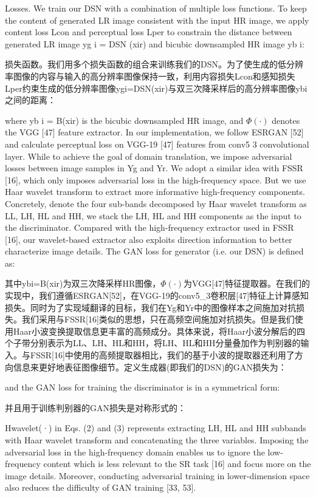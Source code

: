 Losses. We train our DSN with a combination of multiple loss functions. To keep the content of generated LR image consistent with the input HR image, we apply content loss Lcon and perceptual loss Lper to constrain the distance between generated LR image yg i = DSN (xir) and bicubic downsampled HR image yb i:

损失函数。我们用多个损失函数的组合来训练我们的DSN。为了使生成的低分辨率图像的内容与输入的高分辨率图像保持一致，利用内容损失Lcon和感知损失Lper约束生成的低分辨率图像ygi=DSN(xir)与双三次降采样后的高分辨率图像ybi之间的距离：

where yb i = B(xir) is the bicubic downsampled HR image, and $\Phi(\cdot)$ denotes the VGG [47] feature extractor. In our implementation, we follow ESRGAN [52] and calculate perceptual loss on VGG-19 [47] features from conv5 3 convolutional layer. While to achieve the goal of domain translation, we impose adversarial losses between image samples in Yg and Yr. We adopt a similar idea with FSSR [16], which only imposes adversarial loss in the high-frequency space. But we use Haar wavelet transform to extract more informative high-frequency components. Concretely, denote the four sub-bands decomposed by Haar wavelet transform as LL, LH, HL and HH, we stack the LH, HL and HH components as the input to the discriminator. Compared with the high-frequency extractor used in FSSR [16], our wavelet-based extractor also exploits direction information to better characterize image details. The GAN loss for generator (i.e. our DSN) is defined as:

其中ybi=B(xir)为双三次降采样HR图像，$\Phi(\cdot)$为VGG[47]特征提取器。在我们的实现中，我们遵循ESRGAN[52]，在VGG-19的conv5\_3卷积层[47]特征上计算感知损失。同时为了实现域翻译的目标，我们在Yg和Yr中的图像样本之间施加对抗损失。我们采用与FSSR[16]类似的思想，只在高频空间施加对抗损失。但是我们使用Haar小波变换提取信息更丰富的高频成分。具体来说，将Haar小波分解后的四个子带分别表示为LL、LH、HL和HH，将LH、HL和HH分量叠加作为判别器的输入。与FSSR[16]中使用的高频提取器相比，我们的基于小波的提取器还利用了方向信息来更好地表征图像细节。定义生成器(即我们的DSN)的GAN损失为：

and the GAN loss for training the discriminator is in a symmetrical form:

并且用于训练判别器的GAN损失是对称形式的：

Hwavelet(·) in Eqs. (2) and (3) represents extracting LH, HL and HH subbands with Haar wavelet transform and concatenating the three variables. Imposing the adversarial loss in the high-frequency domain enables us to ignore the low-frequency content which is less relevant to the SR task [16] and focus more on the image details. Moreover, conducting adversarial training in lower-dimension space also reduces the difficulty of GAN training [33, 53].

